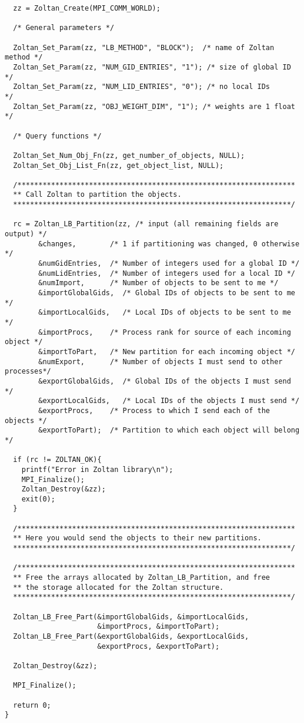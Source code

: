 \begin{flushleft}
\begin{verbatim}
  zz = Zoltan_Create(MPI_COMM_WORLD);

  /* General parameters */

  Zoltan_Set_Param(zz, "LB_METHOD", "BLOCK");  /* name of Zoltan method */
  Zoltan_Set_Param(zz, "NUM_GID_ENTRIES", "1"); /* size of global ID    */
  Zoltan_Set_Param(zz, "NUM_LID_ENTRIES", "0"); /* no local IDs         */
  Zoltan_Set_Param(zz, "OBJ_WEIGHT_DIM", "1"); /* weights are 1 float   */

  /* Query functions */

  Zoltan_Set_Num_Obj_Fn(zz, get_number_of_objects, NULL);
  Zoltan_Set_Obj_List_Fn(zz, get_object_list, NULL);

  /******************************************************************
  ** Call Zoltan to partition the objects.
  ******************************************************************/

  rc = Zoltan_LB_Partition(zz, /* input (all remaining fields are output) */
        &changes,        /* 1 if partitioning was changed, 0 otherwise */ 
        &numGidEntries,  /* Number of integers used for a global ID */
        &numLidEntries,  /* Number of integers used for a local ID */
        &numImport,      /* Number of objects to be sent to me */
        &importGlobalGids,  /* Global IDs of objects to be sent to me */
        &importLocalGids,   /* Local IDs of objects to be sent to me */
        &importProcs,    /* Process rank for source of each incoming object */
        &importToPart,   /* New partition for each incoming object */
        &numExport,      /* Number of objects I must send to other processes*/
        &exportGlobalGids,  /* Global IDs of the objects I must send */
        &exportLocalGids,   /* Local IDs of the objects I must send */
        &exportProcs,    /* Process to which I send each of the objects */
        &exportToPart);  /* Partition to which each object will belong */

  if (rc != ZOLTAN_OK){
    printf("Error in Zoltan library\n");
    MPI_Finalize();
    Zoltan_Destroy(&zz);
    exit(0);
  }

  /******************************************************************
  ** Here you would send the objects to their new partitions.
  ******************************************************************/

  /******************************************************************
  ** Free the arrays allocated by Zoltan_LB_Partition, and free
  ** the storage allocated for the Zoltan structure.
  ******************************************************************/

  Zoltan_LB_Free_Part(&importGlobalGids, &importLocalGids, 
                      &importProcs, &importToPart);
  Zoltan_LB_Free_Part(&exportGlobalGids, &exportLocalGids, 
                      &exportProcs, &exportToPart);

  Zoltan_Destroy(&zz);

  MPI_Finalize();

  return 0;
}
\end{verbatim}
\end{flushleft}

